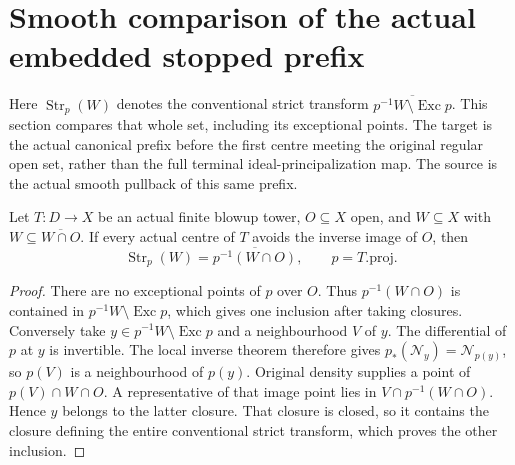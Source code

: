\section{Smooth comparison of the actual embedded stopped prefix}

Here $\operatorname{Str}_p(W)$ denotes the conventional strict transform
$\overline{p^{-1}W\setminus\operatorname{Exc}p}$.  This section compares
that whole set, including its exceptional points.  The target is the
actual canonical prefix before the first centre meeting the original
regular open set, rather than the full terminal ideal-principalization
map.  The source is the actual smooth pullback of this same prefix.

\begin{lemma}
\label{hir:original-strict-transform-dense-preserved-open}
\leanok
{}
Let $T:D\to X$ be an actual finite blowup tower, $O\subseteq X$ open,
and $W\subseteq X$ with $W\subseteq\overline{W\cap O}$.  If every actual
centre of $T$ avoids the inverse image of $O$, then
\[
 \operatorname{Str}_p(W)=\overline{p^{-1}(W\cap O)},\qquad p=T.\mathrm{proj}.
\]
\end{lemma}
\begin{proof}
There are no exceptional points of $p$ over $O$.  Thus
$p^{-1}(W\cap O)$ is contained in $p^{-1}W\setminus\operatorname{Exc}p$,
which gives one inclusion after taking closures.  Conversely take
$y\in p^{-1}W\setminus\operatorname{Exc}p$ and a neighbourhood $V$ of $y$.
The differential of $p$ at $y$ is invertible.  The local inverse theorem
therefore gives $p_*(\mathcal N_y)=\mathcal N_{p(y)}$, so $p(V)$ is a
neighbourhood of $p(y)$.  Original density supplies a point of
$p(V)\cap W\cap O$.  A representative of that image point lies in
$V\cap p^{-1}(W\cap O)$.  Hence $y$ belongs to the latter closure.
That closure is closed, so it contains the closure defining the entire
conventional strict transform, which proves the other inclusion.
\end{proof}

